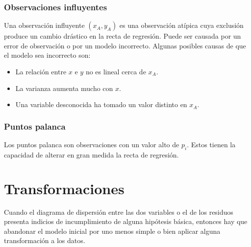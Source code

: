 \subsubsection{Observaciones influyentes}
Una observación influyente $(x_A, y_A)$ es una observación atípica cuya exclusión produce un cambio drástico en la recta de regresión. Puede ser causada por un error de observación o por un modelo incorrecto. Algunas posibles causas de que el modelo sea incorrecto son:
\begin{itemize}
    \item La relación entre $x$ e $y$ no es lineal cerca de $x_A$.
    \item La varianza aumenta mucho con $x$.
    \item Una variable desconocida ha tomado un valor distinto en $x_A$.
\end{itemize}

\subsubsection{Puntos palanca}
Los puntos palanca son observaciones con un valor alto de $p_i$.
Estos tienen la capacidad de alterar en gran medida la recta de regresión.

\section{Transformaciones}
Cuando el diagrama de dispersión entre las dos variables o el de los residuos presenta indicios de incumplimiento de alguna hipótesis básica, entonces hay que abandonar el modelo inicial por uno menos simple o bien aplicar alguna transformación a los datos.
